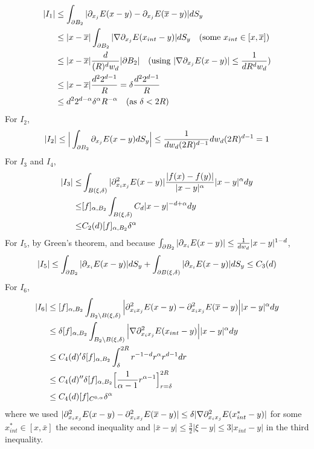 \documentclass[12pt,a4paper]{article}
\newenvironment{proof}
{\begin{changemargin}{0.5cm}{0.5cm} 
	}%
	{\end{changemargin}
}
\newenvironment{p}
{\begin{proof} 
	}%
	{\end{proof}
}
\begin{document}
\begin{p}
\begin{align*}
|I_1| &\leq \int_{\partial B_2} |\partial_{x_j} E(x-y) - \partial_{x_j} E(\overline{x}-y)|dS_y \\
&\leq |x-\overline{x}|\int_{\partial B_2} |\nabla \partial_{x_j} E(x_{int} -y)| dS_y \quad (\text{some } x_{int} \in [x,\overline{x}]) \\
&\leq |x-\overline{x}| \frac{d}{(R)^d w_d} |\partial B_2| \quad (\text{using } |\nabla \partial_{x_j} E(x-y)|\leq \frac{1}{dR^d w_d}) \\
&\leq |x-\overline{x}| \frac{d^2 2^{d-1}}{R} = \delta \frac{d^2 2^{d-1}}{R} \\
&\leq d^2 2^{d-\alpha} \delta^{\alpha} R^{-\alpha} \quad (\text{as } \delta < 2R)
\end{align*}
For $I_2$,
\begin{align*}
|I_2| \leq \Big| \int_{\partial B_2} \partial_{x_j} E(x-y) dS_y \Big| \leq \frac{1}{dw_d (2R)^{d-1}} dw_d (2R)^{d-1} =1
\end{align*}
For $I_3$ and $I_4$,
\begin{align*}
|I_3| \leq &\int_{B(\xi, \delta)} |\partial_{x_i x_j}^2 E(x-y)| \frac{|f(x)-f(y)|}{|x-y|^{\alpha}} |x-y|^{\alpha} dy \\
\leq & [f]_{\alpha, B_2} \int_{B(\xi, \delta)} C_d|x-y|^{-d +\alpha} dy \\
\leq & C_2(d) [f]_{\alpha, B_2} \delta^{\alpha}
\end{align*}
For $I_5$, by Green's theorem, and because $\int_{\partial B_2} |\partial_{x_i} E(x-y) | \leq \frac{1}{dw_d}|x-y|^{1-d}$,
\begin{align*}
|I_5| \leq \int_{\partial B_2} |\partial_{x_i} E(x-y) | dS_y + \int_{\partial B(\xi, \delta)}| \partial_{x_i} E(x-y)|dS_y \leq C_3(d) 
\end{align*}
For $I_6$, 
\begin{align*}
|I_6| &\leq [f]_{\alpha, B_2} \int_{B_2 \backslash B(\xi, \delta)} \Big|\partial^2_{x_i x_j} E(x-y) -\partial^2_{x_i x_j} E(\overline{x}-y)\Big| |x-y|^{\alpha} dy \\
&\leq \delta[f]_{\alpha, B_2} \int_{B_2 \backslash B(\xi, \delta)} \Big| \nabla \partial_{x_i x_j}^2 E(x_{int} -y)\Big| |x-y|^{\alpha} dy \\
&\leq C_4(d)' \delta[f]_{\alpha, B_2} \int_{\delta}^{2R} r^{-1-d} r^{\alpha} r^{d-1} dr \\
&\leq C_4(d)'' \delta[f]_{\alpha, B_2}\Big[ \frac{1}{\alpha-1}r^{\alpha-1}\Big]_{r=\delta}^{2R} \\
&\leq C_4(d) [f]_{C^{0, \alpha}} \delta^{\alpha}
\end{align*}
where we used $|\partial^2_{x_i x_j} E(x-y) -\partial^2_{x_i x_j} E(\overline{x}-y)| \leq \delta |\nabla \partial_{x_i x_j}^2 E(x_{int}^* - y)|$ for some $x^*_{int} \in [x, \bar{x}]$ the second inequality and $|\bar{x}-y|\leq \frac{3}{2} |\xi -y| \leq 3|x_{int}-y|$ in the third inequality. 

\eop
\end{p}
\s
\end{document}
